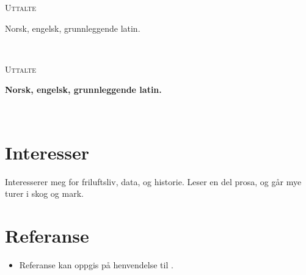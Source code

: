\documentclass[a4paper,
		10pt]{article}
\let\oldhref\href
\renewcommand{\href}[3][blue]{\oldhref{#2}{\color{#1}{#3}}}
\newcommand{\entry}[4]{
\ifthenelse{\isempty{#3}}
{\slimentry{#1}{#2}}{

\begin{minipage}[t]{.15\linewidth}
\hfill \textsc{#1}
\end{minipage}
\hfill\vline\hfill
\begin{minipage}[t]{.80\linewidth}
{\bf#2}\\\textit{#3} \footnotesize{#4}
\end{minipage}\\
\vspace{.2cm}
}}
\newcommand{\slimentry}[2]{

\begin{minipage}[t]{.15\linewidth}
\hfill \textsc{#1}
\end{minipage}
\hfill\vline\hfill
\begin{minipage}[t]{.80\linewidth}
#2
\end{minipage}\\
\vspace{.25cm}
}%
\begin{document}
\entry{Uttalte}
	{Norsk, engelsk, grunnleggende latin.}
	{}
	{}

\section{Interesser}

Interesserer meg for friluftsliv, data, og historie. Leser en del prosa, og går mye turer i skog og mark.

\section{Referanse}

\begin{itemize}
\item Referanse kan oppgis på henvendelse til \href{mailto:gunnar@ghalv.no}{gunnar@ghalv.no}.
\end{itemize}
\end{document}
